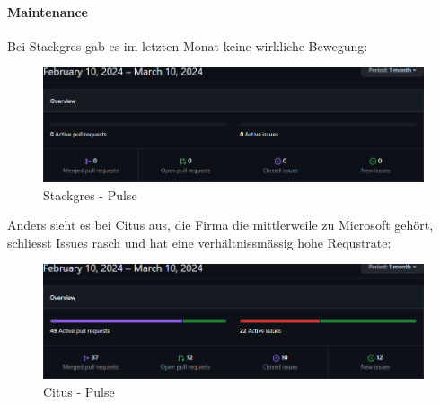 \begin{flushleft}
    \paragraph{Maintenance}
    Bei Stackgres gab es im letzten Monat keine wirkliche Bewegung:
    \begin{figure}[H]
        \centering
        \includegraphics[width=0.75\linewidth]{source/implementation/evaluation/postgresql_ha_solutions/insights/stackgres_citus/pulse_ongres_stackgres}
        \caption{Stackgres - Pulse}
        \label{fig:pulse_ongres_stackgres}
    \end{figure}
    Anders sieht es bei Citus aus, die Firma die mittlerweile zu Microsoft gehört, schliesst Issues rasch und hat eine verhältnissmässig hohe Requstrate:
    \begin{figure}[H]
        \centering
        \includegraphics[width=0.75\linewidth]{source/implementation/evaluation/postgresql_ha_solutions/insights/stackgres_citus/pulse_citusdata_citus}
        \caption{Citus - Pulse}
        \label{fig:pulse_citusdata_citus}
    \end{figure}


\end{flushleft}
